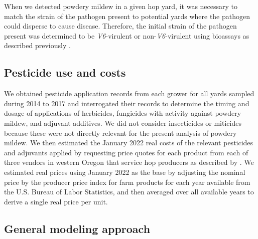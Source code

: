 \documentclass[10pt,a4paper]{article}
\begin{document}
When we detected powdery mildew in a given hop yard, it was necessary to match the strain of the pathogen present to potential yards where the pathogen could disperse to cause disease. Therefore, the initial strain of the pathogen present was determined to be \textit{V6}-virulent or non-\textit{V6}-virulent using bioassays as described previously \parencite{Gent2019a, Wolfenbarger2016}.

\subsection{Pesticide use and costs}

We obtained pesticide application records from each grower for all yards sampled during 2014 to 2017 and interrogated their records to determine the timing and dosage of applications of herbicides, fungicides with activity against powdery mildew, and adjuvant additives. We did not consider insecticides or miticides because these were not directly relevant for the present analysis of powdery mildew. We then estimated the January 2022 real costs of the relevant pesticides and adjuvants applied by requesting price quotes for each product from each of three vendors in western Oregon that service hop producers as described by \parencite{hwang_what_2024}. We estimated real prices using January 2022 as the base by adjusting the nominal price by the producer price index for farm products for each year available from the U.S. Bureau of Labor Statistics, and then averaged over all available years to derive a single real price per unit. 

\subsection{General modeling approach}
\end{document}
